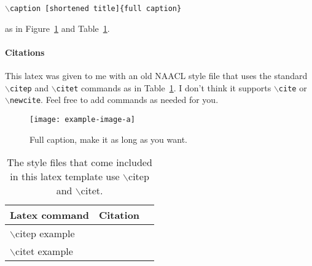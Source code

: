 \texttt{$\backslash$caption [shortened title]\{full caption\}}

\noindent as in Figure~\ref{chap2:fig:ex} and Table~\ref{chap2:tab:ex}.

\paragraph{Citations} This latex was given to me with an old NAACL style file that uses the standard \texttt{$\backslash$citep}  and \texttt{$\backslash$citet}  commands as in Table~\ref{chap2:tab:ex}.  I don't think it supports \texttt{$\backslash$cite} or \texttt{$\backslash$newcite}. Feel free to add commands as needed for you.

\begin{figure}[tb]
    \centering
    \texttt{[image: example-image-a]}
    \caption[Short title  - only appears in list of figures]{Full caption, make it as long as you want.}
    \label{chap2:fig:ex}
\end{figure}


\begin{table}[tb]
    \centering
    \begin{tabular}{lll}
    \toprule
         Latex command & Citation\\
    \midrule
        $\backslash$citep example & \citep{grice1975logic} \\
        $\backslash$citet example & \citet{grice1975logic} \\
    \bottomrule
    \end{tabular}
    \caption[Citation examples]{The style files that come included in this latex template use $\backslash$citep and $\backslash$citet.} 
    \label{chap2:tab:ex}
\end{table}
